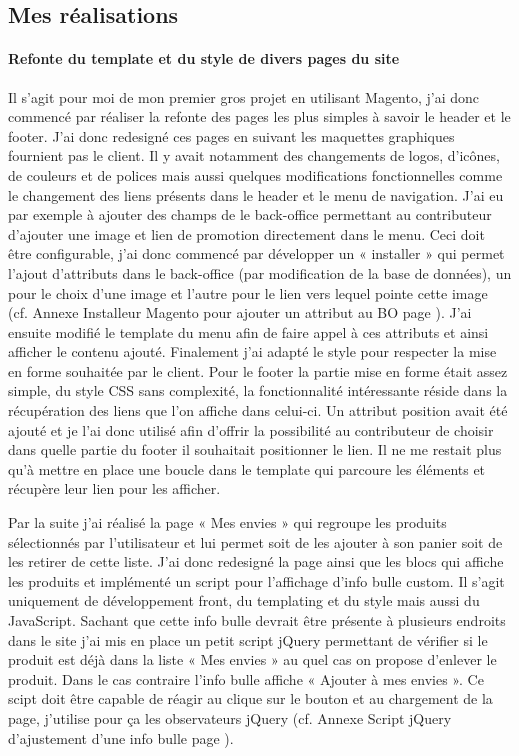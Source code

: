 \documentclass[a4paper,11pt,twoside]{report}
\begin{document}
    \subsection*{Mes réalisations}
    	\paragraph*{Refonte du template et du style de divers pages du site}
	Il s'agit pour moi de mon premier gros projet en utilisant Magento, j'ai donc commencé par réaliser la refonte des pages les plus simples à savoir le header et le footer. J'ai donc redesigné ces pages en suivant les maquettes graphiques fournient pas le client. Il y avait notamment des changements de logos, d'icônes, de couleurs et de polices mais aussi quelques modifications fonctionnelles comme le changement des liens présents dans le header et le menu de navigation. J'ai eu par exemple à ajouter des champs de le back-office permettant au contributeur d'ajouter une image et lien de promotion directement dans le menu. Ceci doit être configurable, j'ai donc commencé par développer un « installer » qui permet l'ajout d'attributs dans le back-office (par modification de la base de données), un pour le choix d'une image et l'autre pour le lien vers lequel pointe cette image (cf. Annexe Installeur Magento pour ajouter un attribut au BO page \pageref{installeur_Magento_pour_ajouter_un_attribut_au_BO}). J'ai ensuite modifié le template du menu afin de faire appel à ces attributs et ainsi afficher le contenu ajouté. Finalement j'ai adapté le style pour respecter la mise en forme souhaitée par le client. Pour le footer la partie mise en forme était assez simple, du style CSS sans complexité, la fonctionnalité intéressante réside dans la récupération des liens que l'on affiche dans celui-ci. Un attribut position avait été ajouté et je l'ai donc utilisé afin d'offrir la possibilité au contributeur de choisir dans quelle partie du footer il souhaitait positionner le lien. Il ne me restait plus qu'à mettre en place une boucle dans le template qui parcoure les éléments et récupère leur lien pour les afficher.
	
	Par la suite j'ai réalisé la page « Mes envies » qui regroupe les produits sélectionnés par l'utilisateur et lui permet soit de les ajouter à son panier soit de les retirer de cette liste. J'ai donc redesigné la page ainsi que les blocs qui affiche les produits et implémenté un script pour l'affichage d'info bulle custom. Il s'agit uniquement de développement front, du templating et du style mais aussi du JavaScript. Sachant que cette info bulle devrait être présente à plusieurs endroits dans le site j'ai mis en place un petit script jQuery permettant de vérifier si le produit est déjà dans la liste « Mes envies » au quel cas on propose d'enlever le produit. Dans le cas contraire l'info bulle affiche « Ajouter à mes envies ». Ce scipt doit être capable de réagir au clique sur le bouton et au chargement de la page, j'utilise pour ça les observateurs jQuery (cf. Annexe Script jQuery d'ajustement d'une info bulle page \pageref{script_jQuery_d_ajustement_d_une_info_bulle}).
\end{document}
